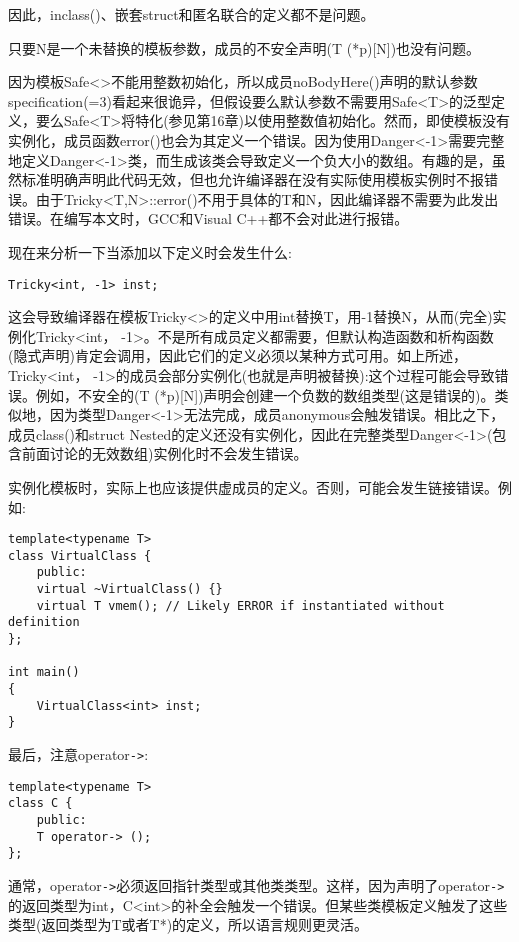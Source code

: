 因此，inclass()、嵌套struct和匿名联合的定义都不是问题。

只要N是一个未替换的模板参数，成员的不安全声明(T (*p)[N])也没有问题。

因为模板Safe<>不能用整数初始化，所以成员noBodyHere()声明的默认参数specification(=3)看起来很诡异，但假设要么默认参数不需要用Safe<T>的泛型定义，要么Safe<T>将特化(参见第16章)以使用整数值初始化。然而，即使模板没有实例化，成员函数error()也会为其定义一个错误。因为使用Danger<-1>需要完整地定义Danger<-1>类，而生成该类会导致定义一个负大小的数组。有趣的是，虽然标准明确声明此代码无效，但也允许编译器在没有实际使用模板实例时不报错误。由于Tricky<T,N>::error()不用于具体的T和N，因此编译器不需要为此发出错误。在编写本文时，GCC和Visual C++都不会对此进行报错。

现在来分析一下当添加以下定义时会发生什么:

\begin{lstlisting}[style=styleCXX]
Tricky<int, -1> inst;
\end{lstlisting}

这会导致编译器在模板Tricky<>的定义中用int替换T，用-1替换N，从而(完全)实例化Tricky<int， -1>。不是所有成员定义都需要，但默认构造函数和析构函数(隐式声明)肯定会调用，因此它们的定义必须以某种方式可用。如上所述，Tricky<int， -1>的成员会部分实例化(也就是声明被替换):这个过程可能会导致错误。例如，不安全的(T (*p)[N])声明会创建一个负数的数组类型(这是错误的)。类似地，因为类型Danger<-1>无法完成，成员anonymous会触发错误。相比之下，成员class()和struct Nested的定义还没有实例化，因此在完整类型Danger<-1>(包含前面讨论的无效数组)实例化时不会发生错误。

实例化模板时，实际上也应该提供虚成员的定义。否则，可能会发生链接错误。例如:

\begin{lstlisting}[style=styleCXX]
template<typename T>
class VirtualClass {
	public:
	virtual ~VirtualClass() {}
	virtual T vmem(); // Likely ERROR if instantiated without definition
};

int main()
{
	VirtualClass<int> inst;
}
\end{lstlisting}

最后，注意operator\texttt{->}:

\begin{lstlisting}[style=styleCXX]
template<typename T>
class C {
	public:
	T operator-> ();
};
\end{lstlisting}

通常，operator\texttt{->}必须返回指针类型或其他类类型。这样，因为声明了operator\texttt{->}的返回类型为int，C<int>的补全会触发一个错误。但某些类模板定义触发了这些类型(返回类型为T或者T*)的定义，所以语言规则更灵活。

